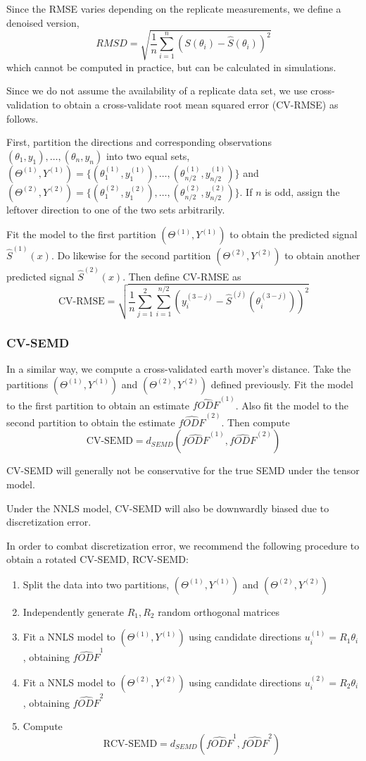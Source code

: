 \documentclass[11pt]{article}
\begin{document}
Since the RMSE varies depending on the replicate measurements, we
define a denoised version,
\[
RMSD = \sqrt{\frac{1}{n}\sum_{i=1}^n (S(\theta_i) - \hat{S}(\theta_i))^2}
\]
which cannot be computed in practice, but can be calculated in simulations.

Since we do not assume the availability of a replicate data set,
we use cross-validation to obtain a cross-validate root mean
squared error (CV-RMSE) as follows.

First, partition the directions and corresponding observations
$(\theta_1,y_1),\hdots,(\theta_n,y_n)$ into two equal sets,
$(\Theta^{(1)},Y^{(1)}) = \{(\theta_1^{(1)},y_1^{(1)}),\hdots,(\theta_{n/2}^{(1)},y_{n/2}^{(1)})\}$ and 
$(\Theta^{(2)},Y^{(2)}) = \{(\theta_1^{(2)},y_1^{(2)}),\hdots,(\theta_{n/2}^{(2)},y_{n/2}^{(2)})\}$.
If $n$ is odd, assign the leftover direction to one of the two sets
arbitrarily.

Fit the model to the first partition $(\Theta^{(1)},Y^{(1)})$
to obtain the predicted signal $\hat{S}^{(1)}(x)$.
Do likewise for the second partition $(\Theta^{(2)},Y^{(2)})$
to obtain another predicted signal $\hat{S}^{(2)}(x)$.
Then define CV-RMSE as
\[
\text{CV-RMSE} = \sqrt{\frac{1}{n}\sum_{j=1}^2 \sum_{i=1}^{n/2} (y_i^{(3-j)} - \hat{S}^{(j)}(\theta_i^{(3-j)}))^2}
\]

\subsubsection{CV-SEMD}\label{cvsemd}

In a similar way, we compute a cross-validated earth mover's distance.
Take the partitions $(\Theta^{(1)},Y^{(1)})$ and $(\Theta^{(2)},Y^{(2)})$
defined previously.
Fit the model to the first partition to obtain an estimate
$\hat{fODF}^{(1)}$.
Also fit the model to the second partition to obtain the estimate
$\hat{fODF}^{(2)}$.
Then compute
\[
\text{CV-SEMD} = d_{SEMD}(\hat{fODF}^{(1)},\hat{fODF}^{(2)})
\]

CV-SEMD will generally not be conservative for the true SEMD under the
tensor model.

Under the NNLS model, CV-SEMD will also be downwardly biased due
to discretization error.

In order to combat discretization error, we recommend the following
procedure to obtain a rotated CV-SEMD, RCV-SEMD:
\begin{enumerate}
\item Split the data into two partitions, $(\Theta^{(1)},Y^{(1)})$ and
  $(\Theta^{(2)},Y^{(2)})$
\item Independently generate $R_1,R_2$ random orthogonal matrices
\item Fit a NNLS model to $(\Theta^{(1)},Y^{(1)})$ using candidate
  directions  $u_i^{(1)} = R_1 \theta_i$, obtaining $\hat{fODF}^1$
\item Fit a NNLS model to $(\Theta^{(2)},Y^{(2)})$ using candidate
  directions  $u_i^{(2)} = R_2 \theta_i$, obtaining $\hat{fODF}^2$
\item Compute
\[
\text{RCV-SEMD} = d_{SEMD}(\hat{fODF}^1, \hat{fODF}^2)
\]
\end{enumerate}
\end{document}
